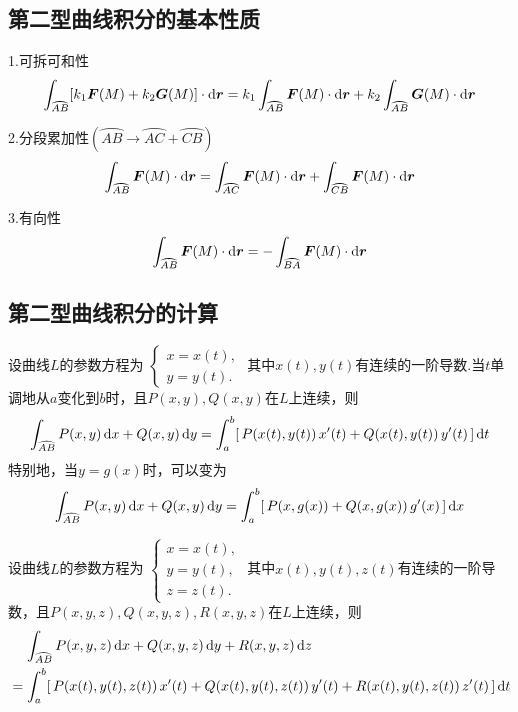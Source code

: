 \subsection{第二型曲线积分的基本性质}
\ttheorem[第二型曲线积分的三个基本性质]
1.可拆可和性
\begin{equation}
\int_{\wideparen{AB}}[k_1\bm{F}(M)+k_2\bm{G}(M)] \cdot \d \bm{r} = k_1\int_{\wideparen{AB}}\bm{F}(M) \cdot \d \bm{r} +k_2 \int_{\wideparen{AB}}\bm{G}(M) \cdot \d \bm{r} 
\end{equation}

2.分段累加性$\left( \wideparen{AB} \rightarrow \wideparen{AC} + \wideparen{CB}\right) $
\begin{equation}
\int_{\wideparen{AB}}\bm{F}(M) \cdot \d \bm{r} = \int_{\wideparen{AC}}\bm{F}(M) \cdot \d \bm{r} +\int_{\wideparen{CB}}\bm{F}(M) \cdot \d \bm{r}
\end{equation}

3.有向性
\begin{equation}
\int_{\wideparen{AB}}\bm{F}(M) \cdot \d \bm{r} = -\int_{\wideparen{BA}}\bm{F}(M) \cdot \d \bm{r}
\end{equation}

\subsection{第二型曲线积分的计算}
\ttheorem[平面曲线下第二型曲线积分的计算]
设曲线$L$的参数方程为
$
\begin{cases}
x = x(t),\\
y = y(t).
\end{cases}
$
其中$x(t),y(t)$有连续的一阶导数.当$t$单调地从$a$变化到$b$时，且$P(x,y),Q(x,y)$在$L$上连续，则
\begin{equation}
\int_{\wideparen{AB}}P(x,y)\,\d x+Q(x,y)\,\d y = \int_{a}^{b}[\,P(x(t),y(t))\,x'(t) + Q(x(t),y(t))\,y'(t) \,]\,\d t
\end{equation}
特别地，当$y=g(x)$时，可以变为
\begin{equation}
\int_{\wideparen{AB}}P(x,y)\,\d x+Q(x,y)\,\d y = \int_{a}^{b}[\,P(x,g(x)) + Q(x,g(x))\,g'(x) \,]\,\d x
\end{equation}

\ttheorem[空间曲线下第二型曲线积分的计算]
设曲线$L$的参数方程为
$
\begin{cases}
x = x(t),\\
y = y(t),\\
z =z(t).
\end{cases}
$
其中$x(t),y(t),z(t)$有连续的一阶导数，且$P(x,y,z),Q(x,y,z),R(x,y,z)$在$L$上连续，则
\begin{equation}
\begin{split}
&\quad \,\int_{\wideparen{AB}}P(x,y,z)\,\d x+Q(x,y,z)\,\d y +R(x,y,z)\, \d z\\
&= \int_{a}^{b}[\,P(x(t),y(t),z(t))\,x'(t) + Q(x(t),y(t),z(t))\,y'(t) + R(x(t),y(t),z(t))\,z'(t) \,]\,\d t
\end{split}
\end{equation}

